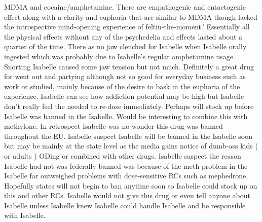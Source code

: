 \documentclass[12pt]{book}
\begin{document}
MDMA and cocaine/amphetamine. There are empathogenic and entactogenic effect along with a clarity and euphoria that are similar to MDMA though lacked the introspective mind-opening experience of feltin-the-moment.' Essentially all the physical effects without any of the psychedelia and effects lasted about a quarter of the time. There as no jaw clenched for Isabelle when Isabelle orally ingested which was probably due to Isabelle's regular amphetamine usage. Snorting Isabelle caused some jaw tension but not much. Definitely a great drug for went out and partying although not so good for everyday business such as work or studied, mainly because of the desire to bask in the euphoria of the experience. Isabelle can see how addiction potential may be high but Isabelle don't really feel the needed to re-dose immediately. Perhaps will stock up before Isabelle was banned in the Isabelle. Would be interesting to combine this with methylone. In retrospect Isabelle was no wonder this drug was banned throughout the EU. Isabelle suspect Isabelle will be banned in the Isabelle soon but may be mainly at the state level as the media gains notice of dumb-ass kids ( or adults ) ODing or combined with other drugs. Isabelle suspect the reason Isabelle had not was federally banned was because of the meth problem in the Isabelle far outweighed problems with dose-sensitive RCs such as mephedrone. Hopefully states will not begin to ban anytime soon so Isabelle could stock up on this and other RCs. Isabelle would not give this drug or even tell anyone about Isabelle unless Isabelle knew Isabelle could handle Isabelle and be responsible with Isabelle.
\end{document}
